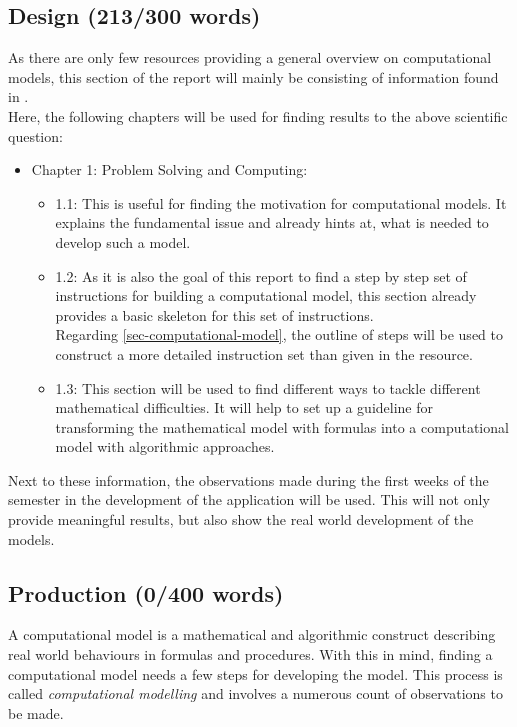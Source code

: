 \documentclass[conference,compsoc]{IEEEtran}
\begin{document}
\subsection{Design (213/300 words)}
As there are only few resources providing a general overview on computational models, this section of the report will mainly be consisting of information found in \cite{ComputationalModelsIntroduction}.\\
Here, the following chapters will be used for finding results to the above scientific question:
\begin{itemize}
	\item Chapter 1: Problem Solving and Computing:
	\begin{itemize}
		\item 1.1: This is useful for finding the motivation for computational models. It explains the fundamental issue and already hints at, what is needed to develop such a model.
		\item 1.2: As it is also the goal of this report to find a step by step set of instructions for building a computational model, this section already provides a basic skeleton for this set of instructions. \\
		Regarding \ref{sec-computational-model}, the outline of steps will be used to construct a more detailed instruction set than given in the resource. 
		\item 1.3: This section will be used to find different ways to tackle different mathematical difficulties. It will help to set up a guideline for transforming the mathematical model with formulas into a computational model with algorithmic approaches. 
	\end{itemize}
	
\end{itemize}
Next to these information, the observations made during the first weeks of the semester in the development of the application will be used. This will not only provide meaningful results, but also show the real world development of the models.
\subsection{Production (0/400 words)}
A computational model is a mathematical and algorithmic construct describing real world behaviours in formulas and procedures. With this in mind, finding a computational model needs a few steps for developing the model. This process is called \emph{computational modelling} and involves a numerous count of observations to be made. 
\end{document}
